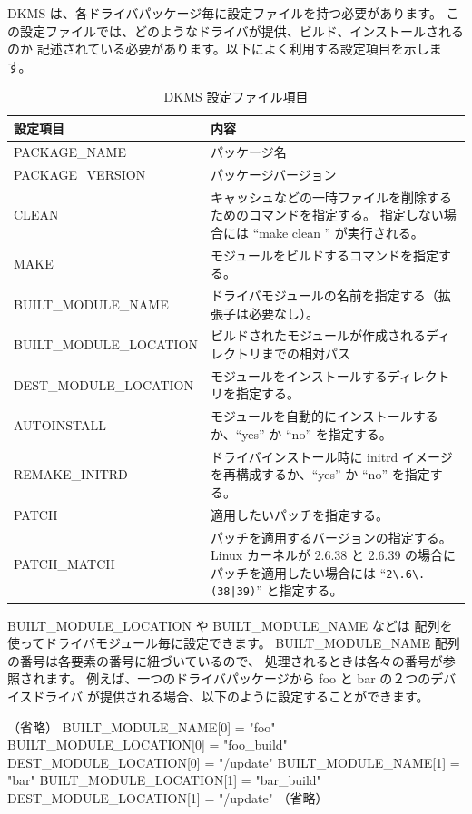 \documentclass[mingoth,a4paper]{jsarticle}
\begin{document}
DKMS は、各ドライバパッケージ毎に設定ファイルを持つ必要があります。
この設定ファイルでは、どのようなドライバが提供、ビルド、インストールされるのか
記述されている必要があります。以下によく利用する設定項目を示します。
\begin{table}[ht]
 \caption{DKMS 設定ファイル項目}
 \label{tab:dkms-config-file}
\begin{center}
  \begin{tabular}{|l|p{}|}
 \hline
 設定項目 & 内容 \\
 \hline \hline
PACKAGE\_NAME & パッケージ名 \\
PACKAGE\_VERSION & パッケージバージョン \\
CLEAN & キャッシュなどの一時ファイルを削除するためのコマンドを指定する。
       指定しない場合には ``make clean '' が実行される。\\
MAKE & モジュールをビルドするコマンドを指定する。\\
BUILT\_MODULE\_NAME & ドライバモジュールの名前を指定する（拡張子は必要なし）。\\
BUILT\_MODULE\_LOCATION &  ビルドされたモジュールが作成されるディレクトリまでの相対パス\\
DEST\_MODULE\_LOCATION & モジュールをインストールするディレクトリを指定する。\\
AUTOINSTALL & モジュールを自動的にインストールするか、``yes'' か ``no'' を指定する。\\
REMAKE\_INITRD & ドライバインストール時に initrd イメージを再構成するか、``yes'' か ``no'' を指定する。 \\
PATCH & 適用したいパッチを指定する。\\
PATCH\_MATCH & パッチを適用するバージョンの指定する。Linux カーネルが 2.6.38 と 2.6.39 の場合にパッチを適用したい場合には ``\verb!2\.6\.(38|39)!'' と指定する。\\
 \hline
 \end{tabular}
\end{center}
\end{table}

BUILT\_MODULE\_LOCATION や BUILT\_MODULE\_NAME などは
配列を使ってドライバモジュール毎に設定できます。
BUILT\_MODULE\_NAME 配列の番号は各要素の番号に紐づいているので、
処理されるときは各々の番号が参照されます。
例えば、一つのドライバパッケージから foo と bar の２つのデバイスドライバ
が提供される場合、以下のように設定することができます。

\begin{commandline}
（省略）
BUILT_MODULE_NAME[0] = "foo"
BUILT_MODULE_LOCATION[0]  = "foo_build"
DEST_MODULE_LOCATION[0] = "/update"
BUILT_MODULE_NAME[1] = "bar"
BUILT_MODULE_LOCATION[1]  = "bar_build"
DEST_MODULE_LOCATION[1] = "/update"
（省略）
\end{commandline}
\end{document}
